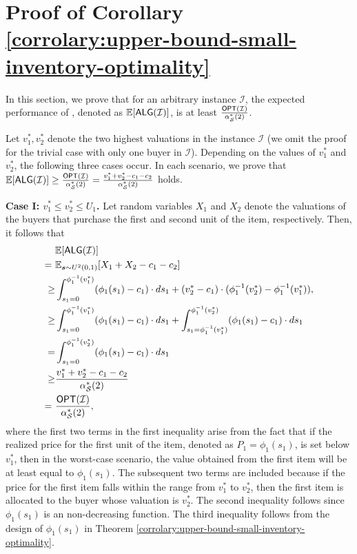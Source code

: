 \section{Proof of Corollary \ref{corrolary:upper-bound-small-inventory-optimality} }
\label{appendix:proof-corrolary:upper-bound-small-inventory-optimality}
In this section, we prove that for an arbitrary instance $\mathcal{I}$, the expected performance of \rDynamic, denoted as $\mathbb{E}[\textsf{ALG}(\mathcal{I})]$, is at least $\frac{\textsf{OPT}(\mathcal{I})}{\alpha_{\mathcal{S}}^*(2)}$. 

Let $v^{*}_{1},v^{*}_{2}$ denote the two highest valuations in the instance $\mathcal{I}$ (we omit the proof for the trivial case with only one buyer in $\mathcal{I}$). Depending on the values of $v^{*}_{1} $ and $v^{*}_{2}$, the following three cases occur. In each scenario, we prove that $\mathbb{E}[\textsf{ALG}(\mathcal{I})] \geq \frac{\textsf{OPT}(\mathcal{I})}{\alpha_{\mathcal{S}}^*(2)} = \frac{v^{*}_{1}+v^{*}_{2}-c_1-c_2}{\alpha_{\mathcal{S}}^*(2)}$ holds.

\textbf{\textbf{Case I}: $v^{*}_{1}\leq v^{*}_{2} \leq U_{1}$.}
Let random variables $X_{1}$ and $X_{2}$ denote the valuations of the buyers that purchase the first and second unit of the item, respectively. Then, it follows that
    \begin{align*}
          & \mathbb{E}[\textsf{ALG}(\mathcal{I})]  \\
       =\ & \mathbb{E}_{\boldsymbol{s} \sim U^{2}(0,1)}[X_{1}+X_{2} - c_{1}-c_{2}]  \\
        \ge & \int_{s_{1}=0}^{\phi_{1}^{-1}(v^{*}_{1})} (\phi_{1}(s_{1})-c_{1}) \cdot ds_{1} + (v^{*}_{2}-c_{1}) \cdot ( \phi_{1}^{-1}(v^{*}_{2})- \phi_{1}^{-1}(v^{*}_{1})), \\
        \ge & \int_{s_{1}=0}^{\phi_{1}^{-1}(v^{*}_{1})} (\phi_{1}(s_{1})-c_{1}) \cdot ds_{1}  + \int_{s_{1}= \phi_{1}^{-1}(v^{*}_{1})}^{\phi_{1}^{-1}(v^{*}_{2})} (\phi_{1}(s_{1})-c_{1}) \cdot ds_{1} \\
         = & \int_{s_{1}=0}^{\phi_{1}^{-1}(v^{*}_{2})} (\phi_{1}(s_{1})-c_{1}) \cdot ds_{1}   \\
        \ge & \frac{v^{*}_{1}+v^{*}_{2}-c_{1}-c_{2}}{\alpha_{\mathcal{S}}^*(2)} \\
        =\ & \frac{\textsf{OPT}(\mathcal{I})}{\alpha_{\mathcal{S}}^*(2)},
    \end{align*}
where the first two terms in the first inequality arise from the fact that if the realized price for the first unit of the item, denoted as $P_{1} = \phi_{1}(s_1)$, is set below $v^{*}_{1}$, then in the worst-case scenario, the value obtained from the first item will be at least equal to $\phi_{1}(s_1)$. The subsequent two terms are included because if the price for the first item falls within the range from $v^{*}_{1}$ to $v^{*}_{2}$, then the first item is allocated to the buyer whose valuation is $v^{*}_{2}$.
The second inequality follows since $\phi_{1}(s_1)$ is an non-decreasing function. The third inequality follows from the design of $\phi_1(s_1)$ in Theorem \ref{corrolary:upper-bound-small-inventory-optimality}. 

